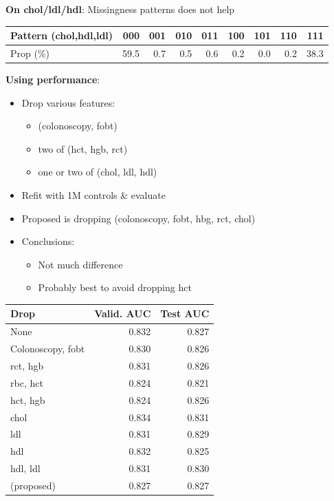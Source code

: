 \documentclass[12pt]{article}
\begin{document}
\clearpage
\textbf{On chol/ldl/hdl}:
Missingness patterns does not help
\begin{table}[h]
\centering
\begin{tabular}{lrrrrrrrr}
\toprule
Pattern (chol,hdl,ldl) & 000 & 001 & 010 & 011 & 100 & 101 & 110 & 111 \\
\midrule
Prop (\%) & 59.5 & 0.7 & 0.5 & 0.6 & 0.2 & 0.0 & 0.2 & 38.3\\
\bottomrule
\end{tabular}
\end{table}

\textbf{Using performance}:
\begin{itemize}
\item Drop various features:
\begin{itemize}
	\item (colonoscopy, fobt)
	\item two of (hct, hgb, rct)
	\item one or two of (chol, ldl, hdl)
\end{itemize}
\item Refit with 1M controls \& evaluate
\item Proposed is dropping (colonoscopy, fobt, hbg, rct, chol)
\item Conclusions:
\begin{itemize}
	\item Not much difference
	\item Probably best to avoid dropping hct
\end{itemize}
\end{itemize}


\begin{table}[ht]
\centering
\begin{tabular}{lrr}
\toprule
Drop & Valid. AUC & Test AUC \\
\midrule
None & 0.832 & 0.827 \\ \addlinespace
Colonoscopy, fobt & 0.830 & 0.826 \\ \addlinespace
rct, hgb & 0.831 & 0.826 \\
rbc, hct & 0.824 & 0.821 \\
hct, hgb & 0.824 & 0.826 \\ \addlinespace
chol & 0.834 & 0.831 \\
ldl & 0.831 & 0.829 \\
hdl & 0.832 & 0.825 \\
hdl, ldl & 0.831 & 0.830 \\ \addlinespace
(proposed) & 0.827 & 0.827 \\
\bottomrule
\end{tabular}
\end{table}
\end{document}
